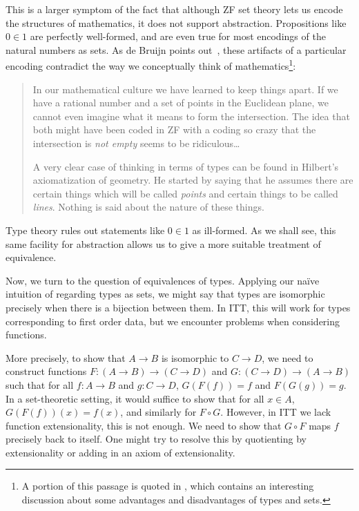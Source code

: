 \documentclass[12pt]{article}
\begin{document}
\begin{enumerate}
This is a larger symptom of the fact that although ZF set theory lets us encode
the structures of mathematics, it does not support abstraction. Propositions
like $0 \in 1$ are perfectly well-formed, and are even true for most encodings
of the natural numbers as sets. As de Bruijn points out~\cite{deBruijn95},
these artifacts of a particular encoding contradict the way we conceptually
think of mathematics\footnote{A portion of this passage is quoted in
\cite{Lamport99}, which contains an interesting discussion about some
advantages and disadvantages of types and sets.}:
%
\begin{quotation}
In our mathematical culture we have learned to keep things apart. If we have a
rational number and a set of points in the Euclidean plane, we cannot even
imagine what it means to form the intersection. The idea that both might have
been coded in ZF with a coding so crazy that the intersection is \emph{not
empty} seems to be ridiculous\dots

A very clear case of thinking in terms of types can be found in Hilbert's
axiomatization of geometry. He started by saying that he assumes there are
certain things which will be called \emph{points} and certain things to be
called \emph{lines}. Nothing is said about the nature of these things.
\end{quotation}
%
Type theory rules out statements like $0 \in 1$ as ill-formed. As we shall see,
this same facility for abstraction allows us to give a more suitable treatment
of equivalence.

\end{enumerate}

Now, we turn to the question of equivalences of types. Applying our na\"ive
intuition of regarding types as sets, we might say that types are isomorphic
precisely when there is a bijection between them. In ITT, this will work for
types corresponding to first order data, but we encounter problems when
considering functions.

More precisely, to show that $A \to B$ is isomorphic to $C \to D$, we need to
construct functions $F: (A \to B) \to (C \to D)$ and $G: (C \to D) \to (A \to
B)$ such that for all $f : A \to B$ and $g : C \to D$, $G(F(f)) = f$ and
$F(G(g)) = g$. In a set-theoretic setting, it would suffice to show that for
all $x \in A$, $G(F(f))(x) = f(x)$, and similarly for $F \circ G$. However, in
ITT we lack function extensionality, this is not enough. We need to show that
$G \circ F$ maps $f$ precisely back to itself.  One might try to resolve this
by quotienting by extensionality or adding in an axiom of extensionality.
\end{document}
